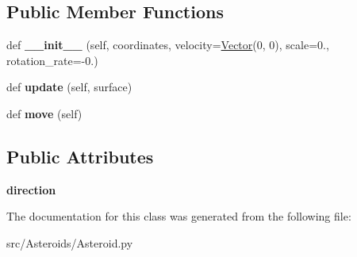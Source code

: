 \subsection*{Public Member Functions}
\begin{DoxyCompactItemize}
\item 
def {\bfseries \+\_\+\+\_\+init\+\_\+\+\_\+} (self, coordinates, velocity=\hyperlink{classVector_1_1Vector}{Vector}(0, 0), scale=0., rotation\+\_\+rate=-\/0.)\hypertarget{classAsteroid_1_1Asteroid_a97fe00ef73eaa80de7eec57530565e7c}{}\label{classAsteroid_1_1Asteroid_a97fe00ef73eaa80de7eec57530565e7c}

\item 
def {\bfseries update} (self, surface)\hypertarget{classAsteroid_1_1Asteroid_ac5a9f9ae0dfd3ff4aa2dabfdd820ebd1}{}\label{classAsteroid_1_1Asteroid_ac5a9f9ae0dfd3ff4aa2dabfdd820ebd1}

\item 
def {\bfseries move} (self)\hypertarget{classAsteroid_1_1Asteroid_af44489831e21c1caa55035370f671d41}{}\label{classAsteroid_1_1Asteroid_af44489831e21c1caa55035370f671d41}

\end{DoxyCompactItemize}
\subsection*{Public Attributes}
\begin{DoxyCompactItemize}
\item 
{\bfseries direction}\hypertarget{classAsteroid_1_1Asteroid_a0a8ab6e30ef6f80384878b4eb4e60d25}{}\label{classAsteroid_1_1Asteroid_a0a8ab6e30ef6f80384878b4eb4e60d25}

\end{DoxyCompactItemize}


The documentation for this class was generated from the following file\+:\begin{DoxyCompactItemize}
\item 
src/\+Asteroids/Asteroid.\+py\end{DoxyCompactItemize}
